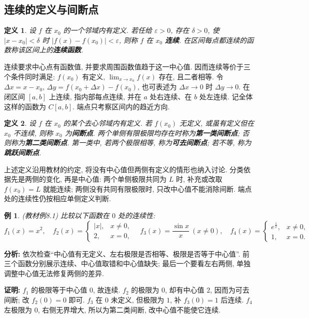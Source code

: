 \documentclass[UTF8,openany]{ctexbook}
\theoremstyle{chinesetextbook}
\newtheorem{definition}{定义}[section]
\newtheorem{example}{例}[section]
\newenvironment{cnproof}{\par\indent\textbf{证明:} \ignorespaces}{\par}
\begin{document}
\subsection{连续的定义与间断点}
\begin{definition}
设 $f$ 在 $x_0$ 的一个邻域内有定义. 若任给 $\varepsilon>0$, 存在 $\delta>0$, 使 $|x-x_0|<\delta$ 时 $|f(x)-f(x_0)|<\varepsilon$, 则称 $f$ 在 $x_0$ \textbf{连续}. 在区间每点都连续的函数称该区间上的\textbf{连续函数}.
\end{definition}
连续要求中心点有函数值, 并要求周围函数值趋于这一中心值. 因而连续等价于三个条件同时满足: $f(x_0)$ 有定义, $\displaystyle \lim_{x\to x_0}f(x)$ 存在, 且二者相等. 令 $\Delta x=x-x_0$, $\Delta y=f(x_0+\Delta x)-f(x_0)$, 也可表述为 $\Delta x\to0$ 时 $\Delta y\to0$.
在闭区间 $[a,b]$ 上连续, 指内部每点连续, 并在 $a$ 处右连续、在 $b$ 处左连续. 记全体这样的函数为 $C[a,b]$. 端点只考察区间内的趋近方向.
\begin{definition}
设 $f$ 在 $x_0$ 的某个去心邻域内有定义. 若 $f(x_0)$ 无定义, 或虽有定义但在 $x_0$ 不连续, 则称 $x_0$ 为\textbf{间断点}. 两个单侧有限极限均存在时称为\textbf{第一类间断点}; 否则称为\textbf{第二类间断点}. 第一类中, 若两个极限相等, 称为\textbf{可去间断点}; 若不等, 称为\textbf{跳跃间断点}.
\end{definition}
上述定义沿用教材的约定, 将没有中心值但两侧有定义的情形也纳入讨论. 分类依据先是两侧的变化, 再是中心值: 两个单侧极限共同为 $L$ 时, 补充或改取 $f(x_0)=L$ 就能连续; 两侧没有共同有限极限时, 只改中心值不能消除间断. 端点处的连续性仍按相应单侧定义判断.
\begin{example}
(教材例8.1) 比较以下函数在 $0$ 处的连续性:
\[
f_1(x)=x^2,\quad
f_2(x)=\begin{cases}|x|,&x\ne0,\\2,&x=0,\end{cases}\quad
f_3(x)=\frac{\sin x}{x}\ (x\ne0),\quad
f_4(x)=\begin{cases}e^{\frac1x},&x\ne0,\\1,&x=0.\end{cases}
\]
\end{example}
\par\indent\textbf{分析:} 依次检查“中心值有无定义、左右极限是否相等、极限是否等于中心值”. 前三个函数分别展示连续、中心值取错和中心值缺失; 最后一个要看左右两侧, 单独调整中心值无法修复两侧的差异.
\begin{cnproof}
$f_1$ 的极限等于中心值 $0$, 故连续. $f_2$ 的极限为 $0$, 却有中心值 $2$, 因而为可去间断; 改 $f_2(0)=0$ 即可. $f_3$ 在 $0$ 未定义, 但极限为 $1$, 补 $f_3(0)=1$ 后连续. $f_4$ 左极限为 $0$, 右侧无界增大, 所以为第二类间断, 改中心值不能使它连续.
\end{cnproof}
\end{document}
